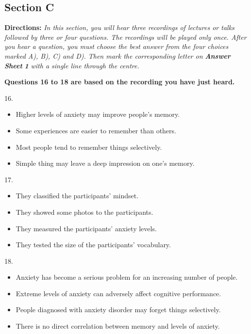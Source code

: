 \documentclass[UTF8,11pt]{ctexart}
\begin{document}
\subsection*{\textbf{Section C}}


\textbf{Directions:}\textit{ In this section, you will hear three recordings of lectures or talks followed by three or four} \textit{questions. The recordings will be played only once. After you hear a question, you must choose the best} \textit{answer from the four choices marked A), B), C) and D). Then mark the corresponding letter on }\textbf{\textit{Answer Sheet}} \textbf{\textit{1}}\textit{ with a single line through the centre.}


\textbf{Questions 16 to 18 are based on the recording you have just heard.}


16.


\begin{itemize}[leftmargin=2em,itemsep=.2em,topsep=.4em]\item[A.] Higher levels of anxiety may improve people’s memory.
\item[B.] Some experiences are easier to remember than others.
\item[C.] Most people tend to remember things selectively.
\item[D.] Simple thing may leave a deep impression on one’s memory.
\end{itemize}

17.


\begin{itemize}[leftmargin=2em,itemsep=.2em,topsep=.4em]\item[A.] They classified the participants’ mindset.
\item[B.] They showed some photos to the participants.
\item[C.] They measured the participants’ anxiety levels.
\item[D.] They tested the size of the participants’ vocabulary.
\end{itemize}

18.


\begin{itemize}[leftmargin=2em,itemsep=.2em,topsep=.4em]\item[A.] Anxiety has become a serious problem for an increasing number of people.
\item[B.] Extreme levels of anxiety can adversely affect cognitive performance.
\item[C.] People diagnosed with anxiety disorder may forget things selectively.
\item[D.] There is no direct correlation between memory and levels of anxiety.
\end{itemize}
\end{document}

